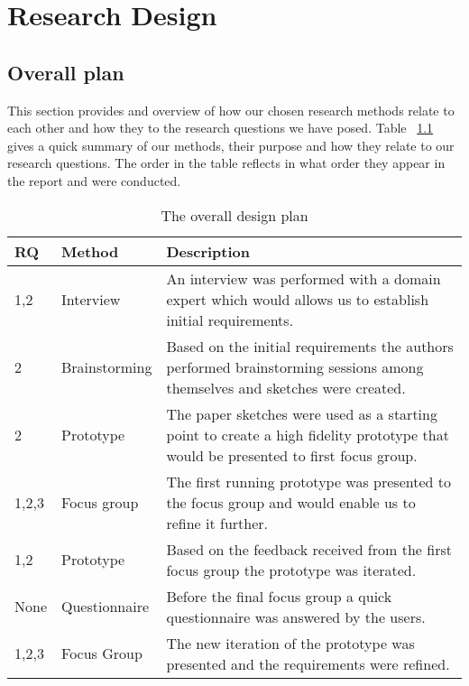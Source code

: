 \chapter{Research Design}


\section{Overall plan}
This section provides and overview of how our chosen research methods relate to each other and how they to the research questions we have posed. Table ~\ref{tab:designPlan} gives a quick summary of our methods, their purpose and how they relate to our research questions. The order in the table reflects in what order they appear in the report and were conducted.

\begin{table}[h!]
  \centering
  \begin{tabular}{|p{0.7cm}|p{2cm}|p{9cm}|}
    \hline
    \textbf{RQ} & \textbf{Method} & \textbf{Description} \\ \hline
    1,2 & Interview & An interview was performed with a domain expert which would allows us to establish initial requirements. \\ \hline
    2 & Brainstorming & Based on the initial requirements the authors performed brainstorming sessions among themselves and sketches were created. \\ \hline
    2 & Prototype & The paper sketches were used as a starting point to create a high fidelity prototype that would be presented to first focus group. \\ \hline
    1,2,3 & Focus group & The first running prototype was presented to the focus group and would enable us to refine it further. \\ \hline
    1,2 & Prototype & Based on the feedback received from the first focus group the prototype was iterated. \\ \hline
    None & Questionnaire & Before the final focus group a quick questionnaire was answered by the users. \\ \hline
    1,2,3 & Focus Group & The new iteration of the prototype was presented and the requirements were refined. \\ \hline
  \end{tabular}
  \caption{The overall design plan}
  \label{tab:designPlan}
\end{table}

